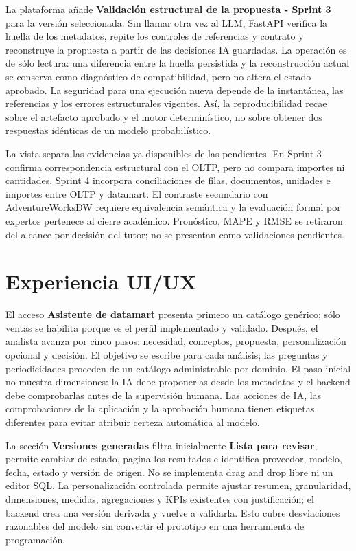 \documentclass[11pt,letterpaper]{article}
\begin{document}
La plataforma añade \textbf{Validación estructural de la propuesta - Sprint 3} para la versión seleccionada. Sin llamar otra vez al LLM, FastAPI verifica la huella de los metadatos, repite los controles de referencias y contrato y reconstruye la propuesta a partir de las decisiones IA guardadas. La operación es de sólo lectura: una diferencia entre la huella persistida y la reconstrucción actual se conserva como diagnóstico de compatibilidad, pero no altera el estado aprobado. La seguridad para una ejecución nueva depende de la instantánea, las referencias y los errores estructurales vigentes. Así, la reproducibilidad recae sobre el artefacto aprobado y el motor determinístico, no sobre obtener dos respuestas idénticas de un modelo probabilístico.

La vista separa las evidencias ya disponibles de las pendientes. En Sprint 3 confirma correspondencia estructural con el OLTP, pero no compara importes ni cantidades. Sprint 4 incorpora conciliaciones de filas, documentos, unidades e importes entre OLTP y datamart. El contraste secundario con AdventureWorksDW requiere equivalencia semántica y la evaluación formal por expertos pertenece al cierre académico. Pronóstico, MAPE y RMSE se retiraron del alcance por decisión del tutor; no se presentan como validaciones pendientes.

\section{Experiencia UI/UX}

El acceso \textbf{Asistente de datamart} presenta primero un catálogo genérico; sólo ventas se habilita porque es el perfil implementado y validado. Después, el analista avanza por cinco pasos: necesidad, conceptos, propuesta, personalización opcional y decisión. El objetivo se escribe para cada análisis; las preguntas y periodicidades proceden de un catálogo administrable por dominio. El paso inicial no muestra dimensiones: la IA debe proponerlas desde los metadatos y el backend debe comprobarlas antes de la supervisión humana. Las acciones de IA, las comprobaciones de la aplicación y la aprobación humana tienen etiquetas diferentes para evitar atribuir certeza automática al modelo.

La sección \textbf{Versiones generadas} filtra inicialmente \textbf{Lista para revisar}, permite cambiar de estado, pagina los resultados e identifica proveedor, modelo, fecha, estado y versión de origen. No se implementa drag and drop libre ni un editor SQL. La personalización controlada permite ajustar resumen, granularidad, dimensiones, medidas, agregaciones y KPIs existentes con justificación; el backend crea una versión derivada y vuelve a validarla. Esto cubre desviaciones razonables del modelo sin convertir el prototipo en una herramienta de programación.
\end{document}
